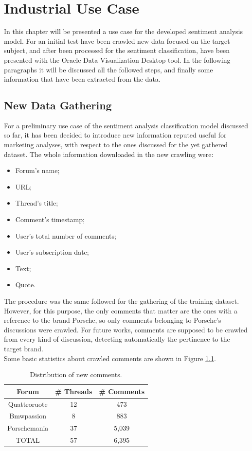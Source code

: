 \chapter{Industrial Use Case}
\label{industrial-use-case}

In this chapter will be presented a use case for the developed sentiment analysis model. For an initial test have been crawled new data focused on the target subject, and after been processed for the sentiment classification, have been presented with the Oracle Data Visualization Desktop tool. In the following paragraphs it will be discussed all the followed steps, and finally some information that have been extracted from the data.

\section{New Data Gathering}

For a preliminary use case of the sentiment analysis classification model discussed so far, it has been decided to introduce new information reputed useful for marketing analyses, with respect to the ones discussed for the yet gathered dataset. The whole information downloaded in the new crawling were:
\begin{itemize}
	\item Forum's name;
	\item URL;
	\item Thread's title;
	\item Comment's timestamp;
	\item User's total number of comments;
	\item User's subscription date;
	\item Text;
	\item Quote.
\end{itemize}

The procedure was the same followed for the gathering of the training dataset. However, for this purpose, the only comments that matter are the ones with a reference to the brand Porsche, so only comments belonging to Porsche's discussions were crawled. For future works, comments are supposed to be crawled from every kind of discussion, detecting automatically the pertinence to the target brand.\\
Some basic statistics about crawled comments are shown in Figure \ref{table:new-comments-test}.

\begin{table}[H]
	\centering
	\begin{tabular}{ | c | c | c | } 
		\hline
		Forum & \# Threads & \# Comments\\
		\hline
		Quattroruote & 12 & 473 \\
		\hline
		Bmwpassion & 8 & 883 \\
		\hline
		Porschemania & 37 & 5,039 \\
		\hline
		\hline
		TOTAL & 57 & 6,395 \\
		\hline		
	\end{tabular}
	\caption{Distribution of new comments.}
	\label{table:new-comments-test}
\end{table}

